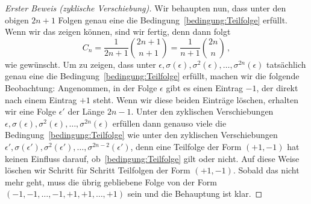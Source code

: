 \begin{proof}[Erster Beweis \textmd{(zyklische Verschiebung)}]
	Wir behaupten nun, dass unter den obigen $2n+1$ Folgen genau eine die Bedingung~\ref{bedingung:Teilfolge} erfüllt. Wenn wir das zeigen können, sind wir fertig, denn dann folgt
	\begin{equation*}
		C_n=\frac{1}{2n+1}\binom{2n+1}{n+1}=\frac{1}{n+1}\binom{2n}{n}\,,
	\end{equation*}
	wie gewünscht. Um zu zeigen, dass unter $\epsilon,\sigma(\epsilon),\sigma^2(\epsilon),\dotsc,\sigma^{2n}(\epsilon)$ tatsächlich genau eine die Bedingung~\ref{bedingung:Teilfolge} erfüllt, machen wir die folgende Beobachtung: Angenommen, in der Folge $\epsilon$ gibt es einen Eintrag $-1$, der direkt nach einem Eintrag $+1$ steht. Wenn wir diese beiden Einträge löschen, erhalten wir eine Folge $\epsilon'$ der Länge $2n-1$.  Unter den zyklischen Verschiebungen $\epsilon,\sigma(\epsilon),\sigma^2(\epsilon),\dotsc,\sigma^{2n}(\epsilon)$ erfüllen dann genauso viele die Bedingung~\ref{bedingung:Teilfolge} wie unter den zyklischen Verschiebungen $\epsilon',\sigma(\epsilon'),\sigma^2(\epsilon'),\dotsc,\sigma^{2n-2}(\epsilon')$, denn eine Teilfolge der Form $(+1,-1)$ hat keinen Einfluss darauf, ob~\ref{bedingung:Teilfolge} gilt oder nicht. Auf diese Weise löschen wir Schritt für Schritt Teilfolgen der Form $(+1,-1)$. Sobald das nicht mehr geht, muss die übrig gebliebene Folge von der Form $(-1,-1,\dotsc,-1,+1,+1,\dotsc,+1)$ sein und die Behauptung ist klar.
\end{proof}

